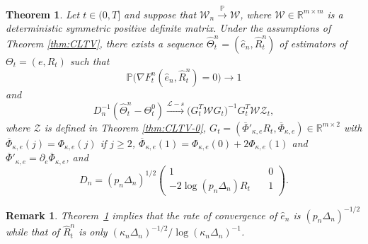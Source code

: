 \documentclass[ecta,nameyear,draft]{econsocart}
\newtheorem{theorem}{Theorem}[section]
\newtheorem{rem}{Remark}
\def\wt{\widetilde}
\def\wh{\widehat}
\def\wb{\overline}
\newcommand{\1}{\mathbf 1}
\newcommand{\PX} { \mathbb{P}}
\newcommand{\calL}{\mathcal{L}}
\newcommand{\calW}{\mathcal{W}}
\newcommand{\calZ}{\mathcal{Z}}
\numberwithin{equation}{section}
\newcommand{\R}{\mathbb{R}}
\newcommand{\ov}{\overline}
\newcommand{\limp}{\stackrel{\mathbb{P}}{\longrightarrow}}
\begin{document}
\begin{theorem}
    \label{thm:base_estimator} Let $t\in(0,T]$ and suppose that $\calW_n\limp \calW$, where $\calW\in\R^{m\times m}$ is a deterministic symmetric   positive definite matrix.
Under the assumptions of Theorem \ref{thm:CLTV}, there exists a sequence $\wh\Theta_t^n = (\wh e_n, \wh R^n_t)$ of estimators of $\Theta_t = (e, R_t)$ such that 
    \begin{equation}
    \label{eq:base_estimator:definition}
        \PX \big(\nabla F^n_t(\wh e_n, \wh R^n_t) = 0 \big) \to 1
    \end{equation}
and
    \begin{equation}
    \label{eq:convfinalest}
         D_n^{-1}(\wh\Theta_t^n - \Theta^0_t) \stackrel{\calL-s}{\longrightarrow} \big( G_t^T \calW G_t \big)^{-1} G_t^T \calW  \calZ_t,
    \end{equation}
where $\calZ$ is defined in Theorem \ref{thm:CLTV-0}, $G_t = ( \ov \Phi'_{\kappa,e} R_t, \ov\Phi_{\kappa,e}) \in \R^{m\times 2}$ with $
\wb \Phi_{\kappa, e}(j) = 
\Phi_{\kappa, e}(j)$ if $j \geq 2$, $\wb \Phi_{\kappa, e}(1)=\Phi_{\kappa, e}(0) + 2\Phi_{\kappa, e}(1)
$ and $\ov \Phi'_{\kappa, e} = \partial_e \ov \Phi_{\kappa,e}$,
and %
    \begin{equation}\label{eq:Dn}
  D_n =
(p_n\Delta_n)^{1/2}
\begin{pmatrix}
1 & \quad0
\\
-2\log(p_n\Delta_n)R_t &\quad 1
\end{pmatrix}. 
\end{equation} 
\end{theorem}


\begin{rem}
Theorem~\ref{thm:base_estimator} implies that the rate of convergence of $\wh e_n$ is $(p_n\Delta_n)^{-1/2}$ while that of $\wh R^n_t$ is only $(\kappa_n\Delta_n)^{-1/2}/ \log(\kappa_n\Delta_n)^{-1}$. %
\end{rem}
\end{document}
